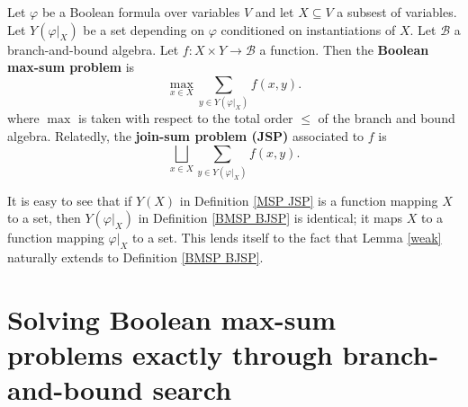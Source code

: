 \documentclass[acmsmall,review]{acmart}\settopmatter{printfolios=true,printccs=false,printacmref=false}
\begin{document}
\begin{definition}\label{BMSP BJSP}
  Let $\varphi$ be a Boolean formula over variables $V$ and let $X \subseteq V$ a subsest of variables. Let $Y(\varphi|_X)$ be a set depending on $\varphi$ conditioned on instantiations of $X$. Let $\mathcal B$ a branch-and-bound algebra. Let $f: X \times Y \to \mathcal B$ a function. Then the \textbf{Boolean max-sum problem} is
  \begin{equation}\label{BMSP}
    \max_{x \in X} \sum_{y \in Y(\varphi|_X)} f(x,y).
  \end{equation}
  where $\max$ is taken with respect to the total order $\leq$ of the branch and bound algebra. Relatedly, the \textbf{join-sum problem (JSP)} associated to $f$ is 
  \begin{equation}\label{BJSP}
    \bigsqcup_{x \in X} \sum_{y \in Y(\varphi|_X)} f(x,y).
  \end{equation}
\end{definition}

It is easy to see that if $Y(X)$ in Definition \ref{MSP JSP} is a function mapping $X$ to a set, then $Y(\varphi|_X)$ in Definition \ref{BMSP BJSP} is identical; it maps $X$ to a function mapping $\varphi|_X$ to a set. This lends itself to the fact that Lemma \ref{weak} naturally extends to Definition \ref{BMSP BJSP}.

\section{Solving Boolean max-sum problems exactly through branch-and-bound search}



% 


\end{document}
